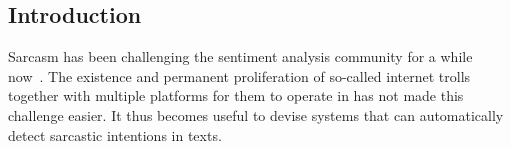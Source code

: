 \documentclass[12pt,a4paper]{report}
\theoremstyle{definition}
\begin{document}
\begin{CJK}{UTF8}{bsmi}



\beforepreface 

\clearpage\maketitle
\thispagestyle{empty}

\afterpreface




\chapter{Introduction}
    
    \par Sarcasm has been challenging the sentiment analysis community for a while now~\cite{feldman2013techniques,maynard2014cares,farias2016irony}.
    The existence and permanent proliferation of so-called internet trolls together with multiple platforms for them to operate in has not made this challenge easier.
    It thus becomes useful to devise systems that can automatically detect sarcastic intentions in texts.
    

\end{CJK}
\end{document}
